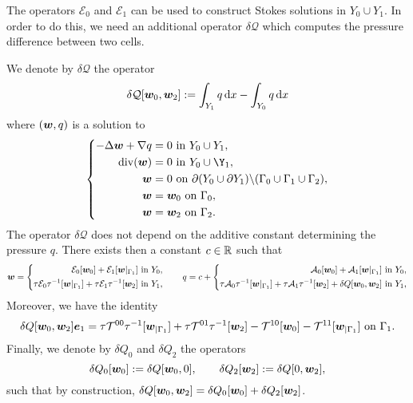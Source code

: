 \documentclass[a4paper,10pt,reqno]{amsart}
\begin{document}
The operators $\mathcal{E}_0$ and $\mathcal{E}_1$ can be used to construct Stokes
solutions in $Y_0\cup Y_1$. In order to do this, we need an additional operator     
$\delta \mathcal{Q}$ which computes the pressure difference between two cells.    
\begin{definition}
    We denote by $\delta \mathcal{Q}$ the operator  
    \begin{equation}
    \label{eqn:rfy49}
        \delta \mathcal{Q}[{\bm w}_0,{\bm w}_2]:=\int_{Y_1}q\,\mathrm{d} x-\int_{Y_0}q\,\mathrm{d} x
    \end{equation}
    where $({\bm w},q)$ is a solution to        
    \begin{equation}
    \label{eqn:c3i38}
    \left\{\begin{aligned}
            -\Delta \w+\nabla q &= 0 \In Y_0\cup Y_1,\\ 
            \div(\w) &= 0 \In Y_0\cup\Y_1,\\  
            \w &= 0 \On \partial(Y_0\cup \partial Y_1)\backslash
            (\Gamma_0\cup\Gamma_1\cup\Gamma_2),\\   
            \w& = \w_0 \On\Gamma_0,\\   
            \w& = \w_2\On\Gamma_2.
    \end{aligned}
    \right.
    \end{equation}
    The operator $\mathcal{\delta Q}$ does not depend on the additive constant
    determining
    the pressure $q$. There exists then a constant $c\in\mathbb{R}$ such that
    \[
    \w= \left\{\begin{aligned}
            \mathcal{E}_0[\w_0]+\mathcal{E}_1[\w|_{\Gamma_1}] \In Y_0,\\
            \tau\mathcal{E}_0\tau^{-1}[\w|_{\Gamma_1}]+\tau\mathcal{E}_1\tau^{-1}[\w_2] \In Y_1,
    \end{aligned}
    \right.\qquad   
    q = c+\left\{\begin{aligned}
            \mathcal{A}_0[\w_0]+\mathcal{A}_1[\w|_{\Gamma_1}] \In Y_0,\\
            \tau\mathcal{A}_0\tau^{-1}[\w|_{\Gamma_1}]+\tau\mathcal{A}_1\tau^{-1}[\w_2] + \delta
            Q[\w_0,\w_2] \In Y_1,
    \end{aligned}
    \right.
    \] 
    Moreover, we have the identity  
    \begin{equation}
    \label{eqn:xvsp4}
    \delta Q[\w_0,\w_2]\e_1 = \tau\mathcal{T}^{00}\tau^{-1}[\w_{|\Gamma_1}] +\tau
    \mathcal{T}^{01}\tau^{-1}[\w_2] -
    \mathcal{T}^{10}[\w_0]-\mathcal{T}^{11}[\w_{|\Gamma_1}] \On \Gamma_1.
    \end{equation}
    Finally, we denote by $\delta Q_0$ and $\delta Q_2$ the operators   
    \begin{equation}
    \label{eqn:6zplh}
        \delta Q_0[{\bm w}_0]:=\delta Q[{\bm w}_0,0], \qquad \delta Q_2[{\bm w}_2]:=\delta
        Q[0,{\bm w}_2],
    \end{equation}
    such that by construction, $\delta Q[{\bm w}_0,{\bm w}_2]=\delta Q_0[{\bm w}_0]+\delta
    Q_2[{\bm w}_2]$.
\end{definition}
\end{document}
